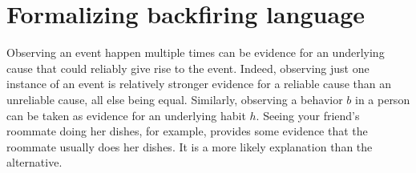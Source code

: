 \documentclass[10pt,letterpaper]{article}
\newcommand{\red}[1]{\textcolor{Red}{#1}}
\newcommand{\mht}[1]{\textcolor{Blue}{[mht: #1]}}
\begin{document}




\section{Formalizing backfiring language}

Observing an event happen multiple times can be evidence for an underlying cause that could reliably give rise to the event.
Indeed, observing just one instance of an event is relatively stronger evidence for a reliable cause than an unreliable cause, all else being equal.
Similarly, observing a behavior $b$ in a person can be taken as evidence for an underlying habit $h$. 
Seeing your friend's roommate doing her dishes, for example, provides some evidence that the roommate usually does her dishes. 
It is a more likely explanation than the alternative.
\end{document}
